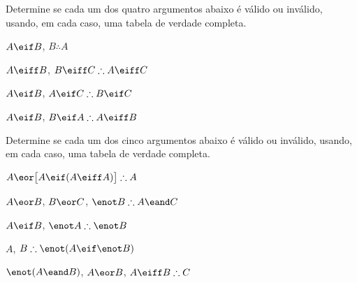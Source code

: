 \noindent\problempart
\label{pr.TT.valid2}
Determine se cada um dos quatro argumentos abaixo é válido ou inválido, usando, em cada caso, uma tabela de verdade completa.
\begin{earg}
\item $A\eif B$, $B \therefore  A$ %

\item $A\eiff B$, $B\eiff C \therefore A\eiff C$ %

\item $A \eif B$, $A \eif C\therefore B \eif C$ %

\item $A \eif B$, $B \eif A\therefore A \eiff B$ %

\end{earg}

\noindent\problempart
\label{pr.TT.valid3}
Determine se cada um dos cinco argumentos abaixo é válido ou inválido, usando, em cada caso, uma tabela de verdade completa.
\begin{earg}
\item $A\eor\bigl[A\eif(A\eiff A)\bigr] \therefore  A $\vspace{.5ex}%
\item $A\eor B$, $B\eor C$, $\enot B \therefore A \eand C$\vspace{.5ex} %
\item $A \eif B$, $\enot A\therefore \enot B$ \vspace{.5ex}%
\item $A$, $B\therefore \enot(A\eif \enot B)$ \vspace{.5ex}%
\item $\enot(A \eand B)$, $A \eor B$, $A \eiff B\therefore C$ \vspace{.5ex}%
\end{earg}

